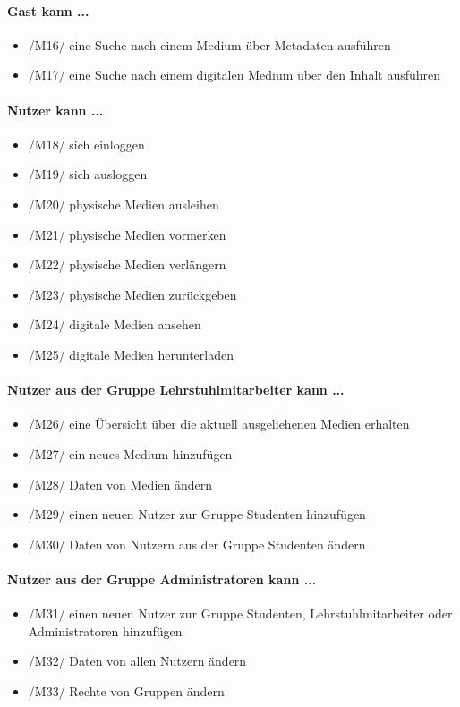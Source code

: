\documentclass[12pt, a4paper]{article}
\begin{document}
\paragraph{Gast kann ...}
\begin{itemize}
	\item /M16/ eine Suche nach einem Medium über Metadaten ausführen
	\item /M17/ eine Suche nach einem digitalen Medium über den Inhalt ausführen
\end{itemize}
\paragraph{Nutzer kann ...}
\begin{itemize}
	\item /M18/ sich einloggen
	\item /M19/ sich ausloggen
	\item /M20/ physische Medien ausleihen
	\item /M21/ physische Medien vormerken
	\item /M22/ physische Medien verlängern
	\item /M23/ physische Medien zurückgeben
	\item /M24/ digitale Medien ansehen
	\item /M25/ digitale Medien herunterladen
\end{itemize}
\paragraph{Nutzer aus der Gruppe Lehrstuhlmitarbeiter kann ...}
\begin{itemize}
	\item /M26/ eine Übersicht über die aktuell ausgeliehenen Medien erhalten
	\item /M27/ ein neues Medium hinzufügen
	\item /M28/ Daten von Medien ändern
	\item /M29/ einen neuen Nutzer zur Gruppe Studenten hinzufügen
	\item /M30/ Daten von Nutzern aus der Gruppe Studenten ändern
\end{itemize}
\paragraph{Nutzer aus der Gruppe Administratoren kann ...}
\begin{itemize}
	\item /M31/ einen neuen Nutzer zur Gruppe Studenten, Lehrstuhlmitarbeiter oder Administratoren hinzufügen
	\item /M32/ Daten von allen Nutzern ändern
	\item /M33/ Rechte von Gruppen ändern
\end{itemize}
\end{document}

